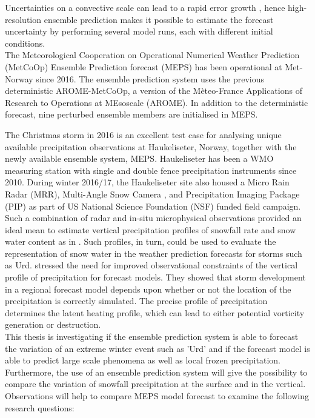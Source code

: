 Uncertainties on a convective scale can lead to a rapid error growth \citep{lorenz_atmospheric_1969}, hence high-resolution ensemble prediction makes it possible to estimate the forecast uncertainty by performing several model runs, each with different initial conditions. %
\\
The Meteorological Cooperation on Operational Numerical Weather Prediction (MetCoOp) Ensemble Prediction forecast (MEPS) has been operational at Met-Norway since 2016. The ensemble prediction system uses the previous deterministic AROME-MetCoOp, a version of the Mèteo-France Applications of Research to Operations at MEsoscale (AROME). In addition to the deterministic forecast, nine perturbed ensemble members are initialised in MEPS. 
\par\medskip
\noindent
The Christmas storm in 2016 is an excellent test case for analysing unique available precipitation observations at Haukeliseter, Norway, together with the newly available ensemble system, MEPS.
Haukeliseter has been a WMO measuring station with single and double fence precipitation instruments since 2010.   During winter 2016/17, the Haukeliseter site also housed a Micro Rain Radar (MRR), Multi-Angle Snow Camera \citep[MASC;][]{garrett_fall_2012}, and Precipitation Imaging Package (PIP) as part of US National Science Foundation (NSF) funded field campaign. Such a combination of radar and in-situ microphysical observations provided an ideal mean to estimate vertical precipitation profiles of snowfall rate and snow water content as in \citet{cooper_variational_2017}. Such profiles, in turn, could be used to evaluate the representation of snow water in the weather prediction forecasts for storms such as Urd. \citet{joos_influence_2012} stressed the need for improved observational constraints of the vertical profile of precipitation for forecast models. They showed that storm development in a regional forecast model depends upon whether or not the location of the precipitation is correctly simulated.  The precise profile of precipitation determines the latent heating profile, which can lead to either potential vorticity generation or destruction. 
\\
This thesis is investigating if the ensemble prediction system is able to forecast the variation of an extreme winter event such as 'Urd' and if the forecast model is able to predict large scale phenomena as well as local frozen precipitation. Furthermore, the use of an ensemble prediction system will give the possibility to compare the variation of snowfall precipitation at the surface and in the vertical. Observations will help to compare MEPS model forecast to examine the following research questions: 
